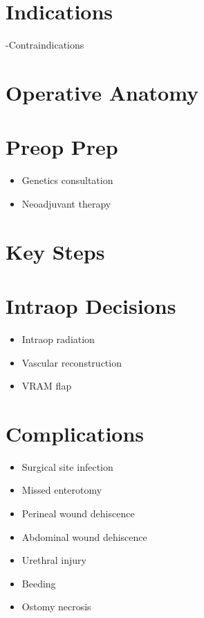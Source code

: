 \documentclass[
]{book}
\providecommand{\tightlist}{%
  \setlength{\itemsep}{0pt}\setlength{\parskip}{0pt}}
\begin{document}
\hypertarget{indications-1}{%
\section{Indications}\label{indications-1}}

-Contraindications

\hypertarget{operative-anatomy}{%
\section{Operative Anatomy}\label{operative-anatomy}}

\hypertarget{preop-prep}{%
\section{Preop Prep}\label{preop-prep}}

\begin{itemize}
\tightlist
\item
  Genetics consultation
\item
  Neoadjuvant therapy
\end{itemize}

\hypertarget{key-steps}{%
\section{Key Steps}\label{key-steps}}

\hypertarget{intraop-decisions}{%
\section{Intraop Decisions}\label{intraop-decisions}}

\begin{itemize}
\tightlist
\item
  Intraop radiation
\item
  Vascular reconstruction
\item
  VRAM flap
\end{itemize}

\hypertarget{complications}{%
\section{Complications}\label{complications}}

\begin{itemize}
\tightlist
\item
  Surgical site infection
\item
  Missed enterotomy
\item
  Perineal wound dehiscence
\item
  Abdominal wound dehiscence
\item
  Urethral injury
\item
  Beeding
\item
  Ostomy necrosis
\end{itemize}
\end{document}

